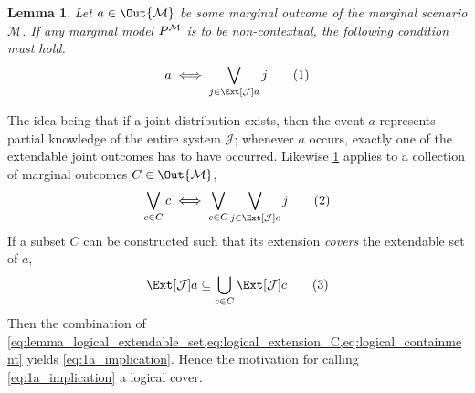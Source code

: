 \documentclass[aps, 10pt, english, twoside, pra, nofootinbib, longbibliography]{revtex4-1}
\theoremstyle{plain}
\newtheorem{lemma}[theorem]{Lemma}
\theoremstyle{definition}
\theoremstyle{remark}
\newcommand{\mscenario}{\mathcal{M}}
\newcommand{\jointvar}{\mathcal{J}}
\begin{document}
    \begin{lemma}
        \label{lemma:logical_extenable_set}
        Let $a \in \Out{\mscenario}$ be some marginal outcome of the marginal scenario $\mscenario$. If any marginal model $\prob^{\mscenario}$ is to be non-contextual, the following condition must hold.
        \[ a \iff \bigvee_{j \in \Ext[\jointvar]{a}} j \eq \label{eq:lemma_logical_extendable_set}\]
    \end{lemma}
    The idea being that if a joint distribution exists, then the event $a$ represents partial knowledge of the entire system $\jointvar$; whenever $a$ occurs, exactly one of the extendable joint outcomes has to have occurred. Likewise \cref{lemma:logical_extenable_set} applies to a collection of marginal outcomes $C \in \Out{\mscenario}$,
    \[ \bigvee_{c \in C} c \iff \bigvee_{c \in C} \bigvee_{j \in \Ext[\jointvar]{c}} j \eq \label{eq:logical_extension_C}\]
    If a subset $C$ can be constructed such that its extension \textit{covers} the extendable set of $a$,
    \[ \Ext[\jointvar]{a} \subseteq \bigcup_{c \in C} \Ext[\jointvar]{c} \eq \label{eq:logical_containment} \]
    Then the combination of \cref{eq:lemma_logical_extendable_set,eq:logical_extension_C,eq:logical_containment} yields \cref{eq:1a_implication}. Hence the motivation for calling \cref{eq:1a_implication} a logical cover.
\end{document}
